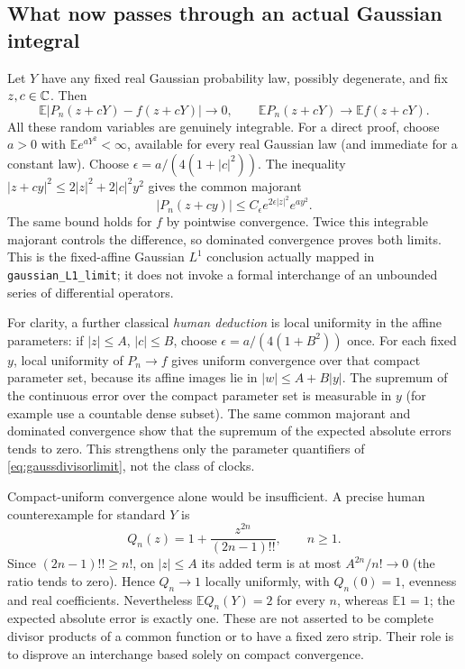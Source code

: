 \documentclass[11pt]{article}
\theoremstyle{remark}\newtheorem{remark}[theorem]{Remark}
\newcommand{\code}[1]{{\small\nolinkurl{#1}}}
\begin{document}
\subsection*{What now passes through an actual Gaussian integral}
Let $Y$ have any fixed real Gaussian probability law, possibly degenerate,
and fix $z,c\in\mathbb C$. Then
\begin{equation}\label{eq:gaussdivisorlimit}
 \mathbb E|P_n(z+cY)-f(z+cY)|\longrightarrow0,
 \qquad
 \mathbb E P_n(z+cY)\longrightarrow\mathbb E f(z+cY).
\end{equation}
All these random variables are genuinely integrable. For a direct proof,
choose $a>0$ with $\mathbb E e^{aY^2}<\infty$, available for every real
Gaussian law (and immediate for a constant law). Choose
$\epsilon=a/(4(1+|c|^2))$. The inequality
$|z+cy|^2\leq2|z|^2+2|c|^2y^2$ gives the common majorant
\[
 |P_n(z+cy)|\leq C_\epsilon e^{2\epsilon|z|^2}e^{ay^2}.
\]
The same bound holds for $f$ by pointwise convergence. Twice this
integrable majorant controls the difference, so dominated convergence
proves both limits. This is the fixed-affine Gaussian $L^1$ conclusion
actually mapped in \code{gaussian_L1_limit}; it does not invoke a
formal interchange of an unbounded series of differential operators.

For clarity, a further classical \emph{human deduction} is local
uniformity in the affine parameters: if $|z|\leq A$, $|c|\leq B$, choose
$\epsilon=a/(4(1+B^2))$ once. For each fixed $y$, local uniformity of
$P_n\to f$ gives uniform convergence over that compact parameter set,
because its affine images lie in $|w|\leq A+B|y|$. The supremum of the
continuous error over the compact parameter set is measurable in $y$
(for example use a countable dense subset). The same common majorant
and dominated convergence show that the supremum of the expected
absolute errors tends to zero. This strengthens only the parameter
quantifiers of \eqref{eq:gaussdivisorlimit}, not the class of clocks.

Compact-uniform convergence alone would be insufficient. A precise
human counterexample for standard $Y$ is
\[
 Q_n(z)=1+\frac{z^{2n}}{(2n-1)!!},\qquad n\geq1.
\]
Since $(2n-1)!!\geq n!$, on $|z|\leq A$ its added term is at most
$A^{2n}/n!\to0$ (the ratio tends to zero). Hence $Q_n\to1$ locally
uniformly, with $Q_n(0)=1$, evenness and real coefficients. Nevertheless
$\mathbb E Q_n(Y)=2$ for every $n$, whereas $\mathbb E1=1$; the expected
absolute error is exactly one. These are not asserted to be complete
divisor products of a common function or to have a fixed zero strip.
Their role is to disprove an interchange based solely on compact convergence.
\end{document}
